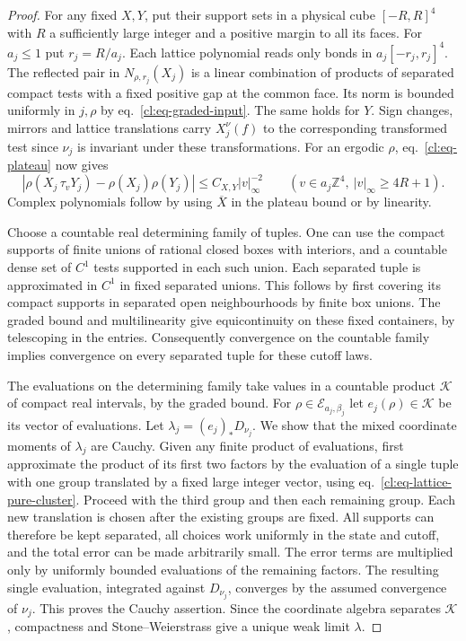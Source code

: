 \documentclass[11pt,letterpaper,reqno]{amsart}
\numberwithin{equation}{section}
\renewcommand{\eqref}[1]{\textup{eq.~\ref{#1}}}
\theoremstyle{definition}
\theoremstyle{remark}
\begin{document}
\begin{proof}
For any fixed \(X,Y\), put their support sets in a physical
cube \([-R,R]^4\) with \(R\) a sufficiently large integer
and a positive margin to all its faces.
For \(a_j\le1\) put \(r_j=R/a_j\).
Each lattice polynomial reads only bonds in \(a_j[-r_j,r_j]^4\).
The reflected pair in \(N_{\rho,r_j}(X_j)\) is a linear
combination of products of separated compact tests with
a fixed positive gap at the common face. Its norm is
bounded uniformly in \(j,\rho\) by
\eqref{cl:eq-graded-input}. The same holds for \(Y\).
Sign changes, mirrors and lattice translations carry
\(X_j^\nu(f)\) to the corresponding transformed test since
\(\nu_j\) is invariant under these transformations.
For an ergodic \(\rho\), \eqref{cl:eq-plateau} now gives
\begin{equation}\label{cl:eq-lattice-pure-cluster}
 |\rho(X_j\,\tau_vY_j)-\rho(X_j)\rho(Y_j)|
                  \le C_{X,Y}|v|_\infty^{-2}
 \qquad (v\in a_j\mathbb Z^4,\ |v|_\infty\ge4R+1).
\end{equation}
Complex polynomials follow by using \(\overline X\) in the
plateau bound or by linearity.

Choose a countable real determining family of tuples. One
can use the compact supports of finite unions of rational
closed boxes with interiors, and a countable dense set of
\(C^1\) tests supported in each such union. Each separated
tuple is approximated in \(C^1\) in fixed separated unions.
This follows by first covering its compact supports in
separated open neighbourhoods by finite box unions.
The graded bound and multilinearity give equicontinuity
on these fixed containers, by telescoping in the entries.
Consequently convergence on the countable family implies
convergence on every separated tuple for these cutoff laws.

The evaluations on the determining family take values in
a countable product \(\mathcal K\) of compact real intervals,
by the graded bound. For \(\rho\in\mathcal E_{a_j,\beta_j}\)
let \(e_j(\rho)\in\mathcal K\) be its vector of evaluations.
Let \(\lambda_j=(e_j)_*D_{\nu_j}\). We show that the mixed
coordinate moments of \(\lambda_j\) are Cauchy. Given any
finite product of evaluations, first approximate the
product of its first two factors by the evaluation of a
single tuple with one group translated by a fixed large
integer vector, using \eqref{cl:eq-lattice-pure-cluster}.
Proceed with the third group and then each remaining
group. Each new translation is chosen after the existing
groups are fixed. All supports can therefore be kept
separated, all choices work uniformly in the state and
cutoff, and the total error can be made arbitrarily small.
The error terms are multiplied only by uniformly bounded
evaluations of the remaining factors. The resulting
single evaluation, integrated against \(D_{\nu_j}\),
converges by the assumed convergence of \(\nu_j\).
This proves the Cauchy assertion. Since the coordinate
algebra separates \(\mathcal K\), compactness and
Stone--Weierstrass give a unique weak limit \(\lambda\).


\end{proof}
\end{document}
